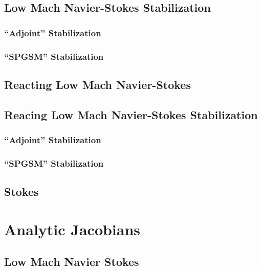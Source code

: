 \documentclass[twoside]{report}
\begin{document}
\chapter{Low Mach Navier-Stokes Stabilization}
\section{``Adjoint'' Stabilization}
\section{``SPGSM'' Stabilization}

\chapter{Reacting Low Mach Navier-Stokes}

\chapter{Reacing Low Mach Navier-Stokes Stabilization}
\section{``Adjoint'' Stabilization}
\section{``SPGSM'' Stabilization}

\chapter{Stokes}





\part{Analytic Jacobians}

\chapter{Low Mach Navier Stokes}


\end{document}
